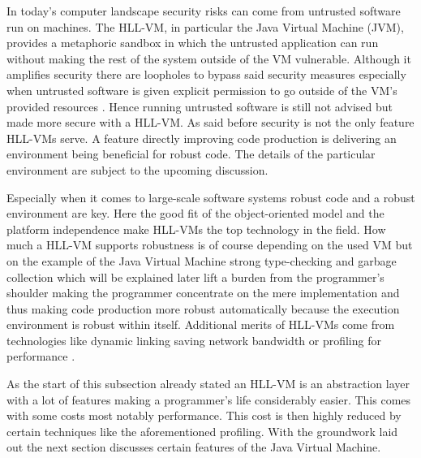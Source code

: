 In today's computer landscape security risks can come from untrusted software run on machines. The HLL-VM, in particular the Java Virtual Machine (JVM),  provides a metaphoric sandbox in which the untrusted application can run without making the rest of the system outside of the VM vulnerable. Although it amplifies security there are loopholes to bypass said security measures especially when untrusted software is given explicit permission to go outside of the VM's provided resources \cite{Smith, Lindholm}. Hence running untrusted software is still not advised but made more secure with a HLL-VM. As said before security is not the only feature HLL-VMs serve. A feature directly improving code production is delivering an environment being beneficial for robust code. The details of the particular environment are subject to the upcoming discussion.

Especially when it comes to large-scale software systems robust code and a robust environment are key. Here the good fit of the object-oriented model and the platform independence make HLL-VMs the top technology in the field. How much a HLL-VM supports robustness is of course depending on the used VM but on the example of the Java Virtual Machine strong type-checking and garbage collection which will be explained later lift a burden from the programmer's shoulder making the programmer concentrate on the mere implementation and thus making code production more robust automatically because the execution environment is robust within itself. Additional merits of HLL-VMs come from technologies like dynamic linking saving network bandwidth or profiling for performance \cite{Smith}.

As the start of this subsection already stated an HLL-VM is an abstraction layer with a lot of features making a programmer's life considerably easier. This comes with some costs most notably performance. This cost is then highly reduced by certain techniques like the aforementioned profiling. With the groundwork laid out the next section discusses certain features of the Java Virtual Machine.

